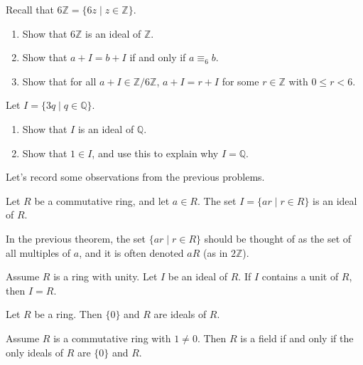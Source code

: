 \begin{problem}\label{prob.RepresentIntegerIdealsWithSmallNumber}
Recall that $6\mathbb{Z} = \{6z \mid z\in \mathbb{Z}\}$.
\begin{enumerate}
\item Show that $6\mathbb{Z}$ is an ideal of $\mathbb{Z}$.
\item Show that $a + I = b + I$ if and only if $a \equiv_6 b$.
\item Show that for all $a + I\in\mathbb{Z}/6\mathbb{Z}$, $a + I = r + I$ for some $r \in \mathbb{Z}$ with $0 \le r < 6$.
\end{enumerate}
\end{problem}

\begin{problem}
Let $I = \{3q \mid q\in \mathbb{Q}\}$.
\begin{enumerate}
\item Show that $I$ is an ideal of $\mathbb{Q}$.
\item Show that $1\in I$, and use this to explain why $I =  \mathbb{Q}$.
\end{enumerate}
\end{problem}

Let's record some observations from the previous problems.

\begin{theorem}\label{thm.MultiplesFormIdeal}
Let $R$ be a commutative ring, and let $a\in R$. The set $I = \{ar\mid r\in R\}$ is an ideal of $R$.
\end{theorem}

In the previous theorem, the set $\{ar\mid r\in R\}$ should be thought of as the set of all multiples of $a$, and it is often denoted $aR$ (as in $2\mathbb{Z}$).

\begin{theorem}\label{thm.IdealContainingUnitsEqualsR}
Assume $R$ is a ring with unity. Let $I$ be an ideal of $R$. If $I$ contains a unit of $R$, then $I = R$.
\end{theorem}

\begin{theorem}
Let $R$ be a ring. Then $\{0\}$ and $R$ are ideals of $R$.
\end{theorem}

\begin{theorem}\label{thm.CharacterizeFieldWithIdeals}
Assume $R$ is a commutative ring with $1\neq 0$. Then $R$ is a field if and only if the only ideals of $R$ are $\{0\}$ and $R$.
\end{theorem}

